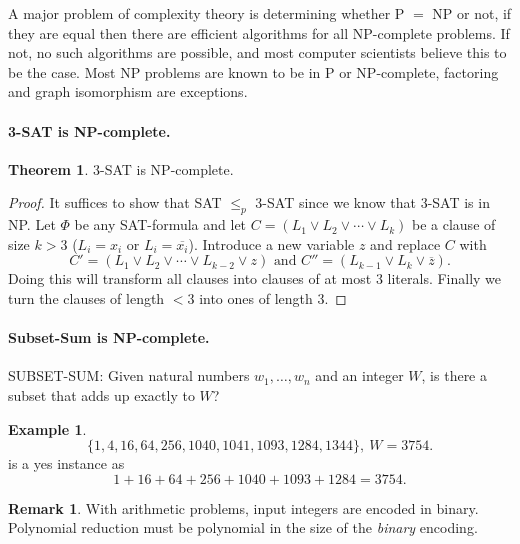 \documentclass[11pt,a4paper]{article}
\theoremstyle{definition}
\newtheorem{thm}{Theorem}
\newtheorem*{ex}{Example}
\newtheorem*{rem}{Remark}
\begin{document}
A major problem of complexity theory is determining whether P $=$ NP or not, if they are equal then there are efficient algorithms for all NP-complete problems.
If not, no such algorithms are possible, and most computer scientists believe this to be the case.
Most NP problems are known to be in P or NP-complete, factoring and graph isomorphism are exceptions.

\paragraph{3-SAT is NP-complete.}
\begin{thm}
3-SAT is NP-complete.
\end{thm}
\begin{proof}
It suffices to show that SAT $\le_p$ 3-SAT since we know that 3-SAT is in NP.%
Let $\Phi$ be any SAT-formula and let $C = (L_1\vee L_2 \vee \cdots \vee L_k)$ be a clause of size $k > 3$ ($L_i = x_i$ or $L_i = \overline{x_i}$).
Introduce a new variable $z$ and replace $C$ with
\[
C' = (L_1 \vee L_2 \vee \cdots \vee L_{k-2} \vee z)\text{ and }C'' = (L_{k-1} \vee L_k \vee \overline{z}).
\]
Doing this will transform all clauses into clauses of at most 3 literals.
Finally we turn the clauses of length $< 3$ into ones of length 3.
\end{proof}

\paragraph{Subset-Sum is NP-complete.}
SUBSET-SUM: Given natural numbers $w_1,\ldots,w_n$ and an integer $W$, is there a subset that adds up exactly to $W$?

\begin{ex}
\[
\{1,4,16,64,256,1040,1041,1093,1284,1344\},\ W = 3754.
\]
is a yes instance as
\[
1 + 16 + 64 + 256 + 1040 + 1093 + 1284 = 3754.
\]
\end{ex}

\begin{rem}
With arithmetic problems, input integers are encoded in binary.
Polynomial reduction must be polynomial in the size of the \emph{binary} encoding.
\end{rem}
\end{document}

